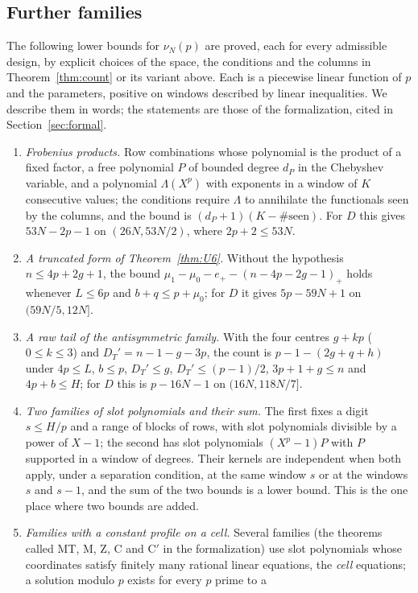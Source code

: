 \subsection{Further families}\label{ssec:families}
The following lower bounds for $\nu_N(p)$ are proved, each for every admissible design, by explicit choices of
the space, the conditions and the columns in Theorem~\ref{thm:count} or its variant above. Each is a
piecewise linear function of $p$ and the parameters, positive on windows described by linear inequalities.
We describe them in words; the statements are those of the formalization, cited in
Section~\ref{sec:formal}.
\begin{enumerate}[label=(\roman*),wide]
\item \emph{Frobenius products.} Row combinations whose polynomial is the product of a fixed factor, a
free polynomial $P$ of bounded degree $d_P$ in the Chebyshev variable, and a polynomial $\Lambda(X^p)$ with
exponents in a window of $K$ consecutive values; the conditions require $\Lambda$ to annihilate the
functionals seen by the columns, and the bound is $(d_P+1)(K-\#\text{seen})$.
For $D$ this gives $53N-2p-1$ on $(26N,53N/2)$, where $2p+2\le53N$.
\item \emph{A truncated form of Theorem~\ref{thm:U6}.} Without the hypothesis $n\le4p+2g+1$, the bound
$\mu_1-\mu_0-e_+-(n-4p-2g-1)_+$ holds whenever $L\le6p$ and $b+q\le p+\mu_0$; for $D$ it gives $5p-59N+1$ on
$(59N/5,12N]$.
\item \emph{A raw tail of the antisymmetric family.} With the four centres $g+kp$ ($0\le k\le3$) and
$D_T'=n-1-g-3p$, the count is
$p-1-(2g+q+h)$ under $4p\le L$, $b\le p$, $D_T'\le g$, $D_T'\le(p-1)/2$, $3p+1+g\le n$ and $4p+b\le H$; for
$D$ this is $p-16N-1$ on $(16N,118N/7]$.
\item \emph{Two families of slot polynomials and their sum.} The first fixes a digit $s\le H/p$ and a range of
blocks of rows, with slot polynomials divisible by a power of $X-1$; the second has slot polynomials
$(X^p-1)P$ with $P$ supported in a window of degrees. Their kernels are independent when both apply,
under a separation condition, at the same window $s$ or at the windows $s$ and $s-1$, and the sum of the
two bounds is a lower bound. This is the one place where two bounds are added.
\item \emph{Families with a constant profile on a cell.} Several families (the theorems called MT, M, Z, C
and $\mathrm C'$ in the formalization) use slot polynomials whose coordinates satisfy finitely many
rational linear equations, the \emph{cell} equations; a solution modulo $p$ exists for every $p$ prime to a

\end{enumerate}

